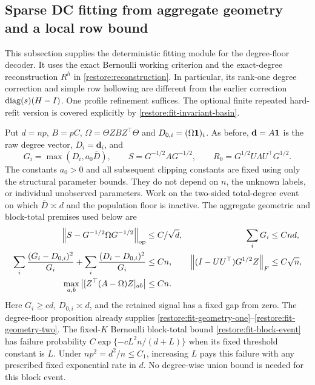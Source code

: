 \subsection{Sparse DC fitting from aggregate geometry and a local row bound}
\label{restore:fit}

This subsection supplies the deterministic fitting module for the
degree-floor decoder. It uses the exact Bernoulli working criterion and
the exact-degree reconstruction $R^h$ in \eqref{restore:reconstruction}.
In particular, its rank-one degree correction and simple row hollowing
are different from the earlier correction $\operatorname{diag}(s)(H-I)$.
One profile refinement suffices. The optional finite repeated hard-refit
version is covered explicitly by \cref{restore:fit-invariant-basin}.

Put $d=np$, $B=pC$, $\Omega=\Theta ZBZ^\top\Theta$ and
$D_{0,i}=(\Omega\mathbf 1)_i$. As before, $\mathbf d=A\mathbf 1$ is the raw
degree vector, $D_i=\mathbf d_i$, and
\[
 G_i=\max(D_i,a_0\overline D),\qquad
 S=G^{-1/2}AG^{-1/2},\qquad
 R_0=G^{1/2}U\Lambda U^\top G^{1/2}.
\]
The constants $a_0>0$ and all subsequent clipping constants are fixed
using only the structural parameter bounds. They do not depend on $n$,
the unknown labels, or individual unobserved parameters.
Work on the two-sided total-degree event on which
$\overline D\asymp d$ and the population floor is inactive.
The aggregate geometric and block-total premises used below are
\begin{align}
 \left\lVert S-G^{-1/2}\Omega G^{-1/2}\right\rVert_{\mathrm{op}}
   &\le C/\sqrt d,&
 \sum_iG_i&\le Cnd, \label{restore:fit-geometry-one}\\
 \sum_i\frac{(G_i-D_{0,i})^2}{G_i}
 +\sum_i\frac{(D_i-D_{0,i})^2}{G_i}
   &\le Cn,&
 \left\lVert(I-UU^\top)G^{1/2}Z\right\rVert_F&\le C\sqrt n,
 \label{restore:fit-geometry-two}\\
 \max_{a,b}\left|[Z^\top(A-\Omega)Z]_{ab}\right|
   &\le Cn.&& \label{restore:fit-block-event}
\end{align}
Here $G_i\ge cd$, $D_{0,i}\asymp d$, and the retained signal has a fixed
gap from zero. The degree-floor proposition already supplies
\eqref{restore:fit-geometry-one}--\eqref{restore:fit-geometry-two}.
The fixed-$K$ Bernoulli block-total bound
\eqref{restore:fit-block-event} has failure probability
$C\exp\{-cL^2n/(d+L)\}$ when its fixed threshold constant is $L$.
Under $np^2=d^2/n\le C_1$, increasing $L$ pays this failure with any
prescribed fixed exponential rate in $d$. No degree-wise union bound
is needed for this block event.

